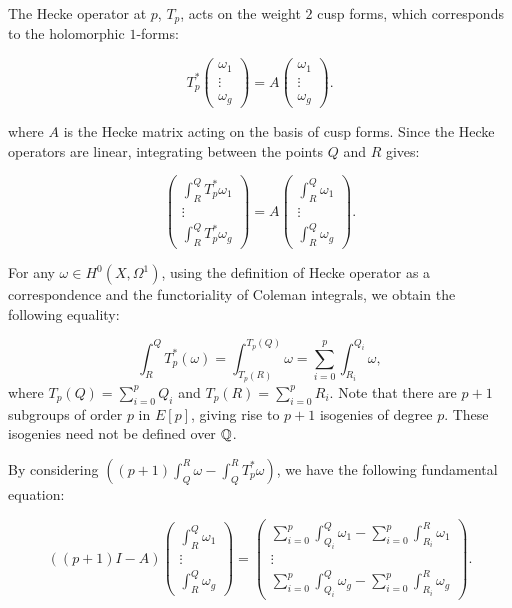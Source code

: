 The Hecke operator at $p$, $T_p$, acts on the weight $2$ cusp forms, which corresponds to the holomorphic $1$-forms:

\[T_p^*\begin{pmatrix} \omega_1 \\\vdots \\ \omega_g \end{pmatrix}  = A\begin{pmatrix} \omega_1 \\\vdots \\ \omega_g \end{pmatrix}.\]

where $A$ is the Hecke matrix acting on the basis of cusp forms. Since the Hecke operators are linear, integrating between the points $Q$ and $R$ gives:

\[\begin{pmatrix} \int^Q_RT_p^*\omega_1 \\\vdots \\ \int^Q_RT_p^*\omega_g \end{pmatrix}  = A\begin{pmatrix} \int^Q_R\omega_1 \\\vdots \\ \int^Q_R\omega_g \end{pmatrix}.\]


For any $\omega \in H^0(X,\Omega^1)$, using the definition of Hecke operator as a correspondence and the functoriality of Coleman integrals, we obtain the following equality:

\[\int^Q_R T_p^*(\omega) = \int^{T_p(Q)}_{T_p(R)} \omega = \sum_{i=0}^{p} \int^{Q_i}_{R_i} \omega,\] where $T_p(Q) = \sum_{i=0}^p Q_i$ and  $T_p(R) = \sum_{i=0}^p R_i$. Note that there are $p+1$ subgroups of order $p$ in $E[p]$, giving rise to $p+1$ isogenies of degree $p$. These isogenies need not be defined over $\mathbb{Q}$.

By considering $((p+1)\int_{Q}^R \omega - \int_Q^R T_p^* \omega)$, we have the following fundamental equation:

\begin{equation}\label{eq:fundamental-eqn}
   ((p+1)I-A)\begin{pmatrix} \int^Q_R\omega_1 \\\vdots \\ \int^Q_R\omega_g \end{pmatrix} =  \begin{pmatrix} \sum_{i=0}^{p}\int^Q_{Q_i} \omega_1 - \sum_{i=0}^{p}\int^R_{R_i} \omega_1 \\\vdots \\ \sum_{i=0}^{p}\int^Q_{Q_i} \omega_g - \sum_{i=0}^{p}\int^R_{R_i} \omega_g \end{pmatrix}.
\end{equation}

